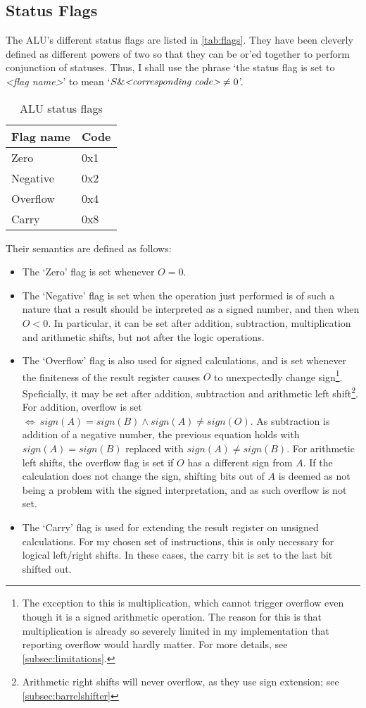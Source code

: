 \documentclass{article}
\begin{document}
\subsection{Status Flags}
\label{subsec:flags}
The ALU's different status flags are listed in \autoref{tab:flags}. They have been cleverly defined as different powers of two so that they can be or'ed together to perform conjunction of statuses. Thus, I shall use the phrase `the status flag is set to \emph{\textless{}flag name\textgreater{}}' to mean `$S \& \emph{\textless{}corresponding code\textgreater{}} \neq 0$'.
\begin{table}[htbp]
  \centering
  \begin{tabular}{|l|l|}
    \hline
    \textbf{Flag name} & \textbf{Code} \\ \hline
    Zero     & 0x1 \\ \hline
    Negative & 0x2 \\ \hline
    Overflow & 0x4 \\ \hline
    Carry    & 0x8 \\ \hline
  \end{tabular}
  \caption{ALU status flags}
  \label{tab:flags}
\end{table}
Their semantics are defined as follows:
\begin{itemize}
\item The `Zero' flag is set whenever $O = 0$.
\item The `Negative' flag is set when the operation just performed is of such a nature that a result should be interpreted as a signed number, and then when $O < 0$. In particular, it can be set after addition, subtraction, multiplication and arithmetic shifts, but not after the logic operations.
\item The `Overflow' flag is also used for signed calculations, and is set whenever the finiteness of the result register causes $O$ to unexpectedly change sign\footnote{The exception to this is multiplication, which cannot trigger overflow even though it is a signed arithmetic operation. The reason for this is that multiplication is already so severely limited in my implementation that reporting overflow would hardly matter. For more details, see \autoref{subsec:limitations}.}. Speficially, it may be set after addition, subtraction and arithmetic left shift\footnote{Arithmetic right shifts will never overflow, as they use sign extension; see \autoref{subsec:barrelshifter}}. For addition, overflow is set~$\iff~sign(A)=sign(B)\wedge{}sign(A)\neq{}sign(O)$. As subtraction is addition of a negative number, the previous equation holds with $sign(A)=sign(B)$ replaced with $sign(A)\neq{}sign(B)$. For arithmetic left shifts, the overflow flag is set if $O$ has a different sign from $A$. If the calculation does not change the sign, shifting bits out of $A$ is deemed as not being a problem with the signed interpretation, and as such overflow is not set.
\item The `Carry' flag is used for extending the result register on unsigned calculations. For my chosen set of instructions, this is only necessary for logical left/right shifts. In these cases, the carry bit is set to the last bit shifted out.
\end{itemize}
\end{document}
